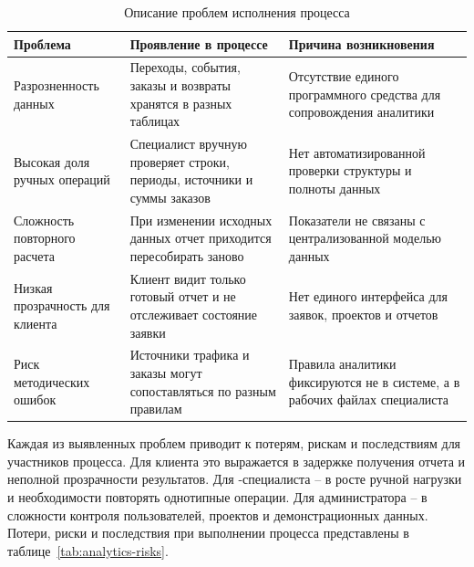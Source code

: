 \begin{table}[H]
    \caption{Описание проблем исполнения процесса}
    \label{tab:analytics-problems}
    {\small
    \setlength{\tabcolsep}{4pt}
    \begin{tabularx}{\textwidth}{|P{0.28\textwidth}|L|L|}
        \hline
        Проблема & Проявление в процессе & Причина возникновения \\
        \hline
        Разрозненность данных & Переходы, события, заказы и возвраты хранятся в разных таблицах & Отсутствие единого программного средства для сопровождения аналитики \\
        \hline
        Высокая доля ручных операций & Специалист вручную проверяет строки, периоды, источники и суммы заказов & Нет автоматизированной проверки структуры и полноты данных \\
        \hline
        Сложность повторного расчета & При изменении исходных данных отчет приходится пересобирать заново & Показатели не связаны с централизованной моделью данных \\
        \hline
        Низкая прозрачность для клиента & Клиент видит только готовый отчет и не отслеживает состояние заявки & Нет единого интерфейса для заявок, проектов и отчетов \\
        \hline
        Риск методических ошибок & Источники трафика и заказы могут сопоставляться по разным правилам & Правила аналитики фиксируются не в системе, а в рабочих файлах специалиста \\
        \hline
    \end{tabularx}
    }
\end{table}

Каждая из выявленных проблем приводит к потерям, рискам и последствиям для участников процесса. Для клиента это выражается в задержке получения отчета и неполной прозрачности результатов. Для -специалиста -- в росте ручной нагрузки и необходимости повторять однотипные операции. Для администратора -- в сложности контроля пользователей, проектов и демонстрационных данных. Потери, риски и последствия при выполнении процесса представлены в таблице~\ref{tab:analytics-risks}.

